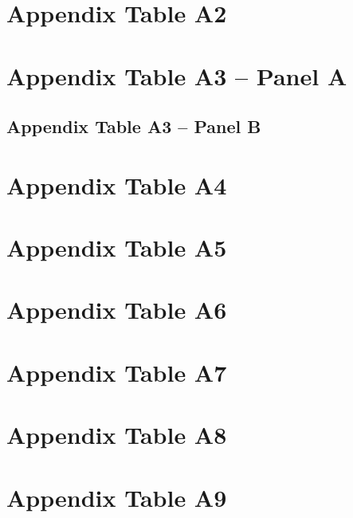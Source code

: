\documentclass[12pt]{article}
\begin{document}
\section{Appendix Table A2}



\clearpage
\section{Appendix Table A3 -- Panel A}



\subsection*{Appendix Table A3 -- Panel B}



\clearpage
\section{Appendix Table A4}



\clearpage
\section{Appendix Table A5}



\clearpage
\section{Appendix Table A6}



\clearpage
\section{Appendix Table A7}



\clearpage
\section{Appendix Table A8}



\clearpage
\section{Appendix Table A9}


\end{document}
